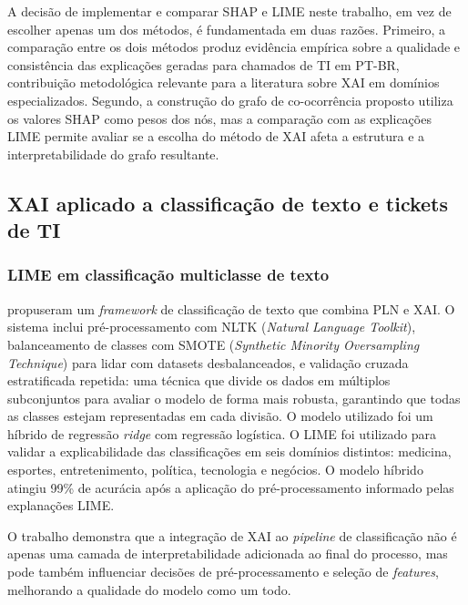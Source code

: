 \documentclass[
    12pt,                %
    openright,           %
    oneside,             %
    a4paper,             %
    english,             %
    brazil               %
]{abntex2}
\begin{document}
A decisão de implementar e comparar SHAP e LIME neste trabalho, em vez de escolher apenas um dos métodos, é fundamentada em duas razões. Primeiro, a comparação entre os dois métodos produz evidência empírica sobre a qualidade e consistência das explicações geradas para chamados de TI em PT-BR, contribuição metodológica relevante para a literatura sobre XAI em domínios especializados. Segundo, a construção do grafo de co-ocorrência proposto utiliza os valores SHAP como pesos dos nós, mas a comparação com as explicações LIME permite avaliar se a escolha do método de XAI afeta a estrutura e a interpretabilidade do grafo resultante.

\subsection{XAI aplicado a classificação de texto e tickets de TI}
\label{subsec:xai_aplicado}

\subsubsection{LIME em classificação multiclasse de texto}
\label{subsubsec:xai_mustafa}

 propuseram um \textit{framework} de 
classificação de texto que combina PLN e XAI. O sistema inclui 
pré-processamento com NLTK (\textit{Natural Language Toolkit}), 
balanceamento de classes com SMOTE (\textit{Synthetic Minority 
Oversampling Technique}) para lidar com datasets desbalanceados, 
e validação cruzada estratificada repetida: uma técnica que divide 
os dados em múltiplos subconjuntos para avaliar o modelo de forma 
mais robusta, garantindo que todas as classes estejam representadas 
em cada divisão. O modelo utilizado foi um híbrido de regressão 
\textit{ridge} com regressão logística. O LIME foi utilizado para 
validar a explicabilidade das classificações em seis domínios 
distintos: medicina, esportes, entretenimento, política, tecnologia 
e negócios. O modelo híbrido atingiu 99\% de acurácia após a 
aplicação do pré-processamento informado pelas explanações LIME.

O trabalho demonstra que a integração de XAI ao \textit{pipeline} 
de classificação não é apenas uma camada de interpretabilidade 
adicionada ao final do processo, mas pode também influenciar 
decisões de pré-processamento e seleção de \textit{features}, 
melhorando a qualidade do modelo como um todo.
\end{document}
